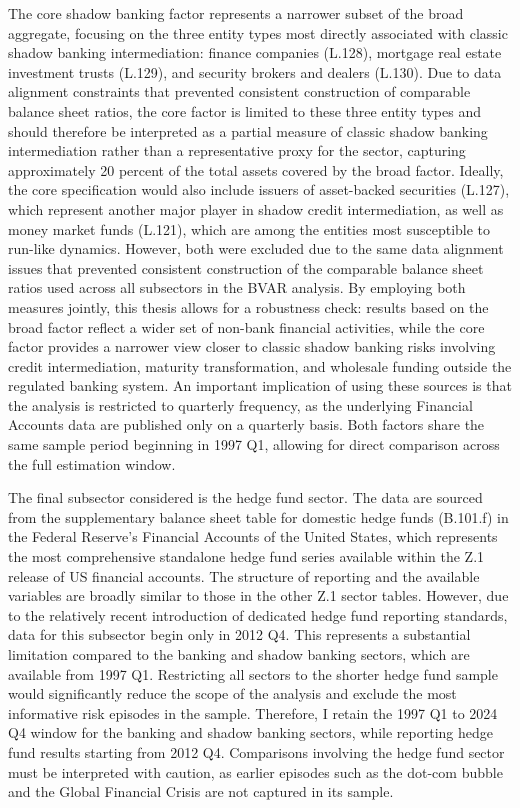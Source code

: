 \documentclass[12pt,a4paper]{report}\usepackage[a4paper, top=2.5cm, bottom=2.5cm, left=2.5cm, right=2.5cm]{geometry}
\begin{document}
The core shadow banking factor represents a narrower subset of the broad aggregate, focusing on the three entity types most directly associated with classic shadow banking intermediation: finance companies (L.128), mortgage real estate investment trusts (L.129), and security brokers and dealers (L.130). Due to data alignment constraints that prevented consistent construction of comparable balance sheet ratios, the core factor is limited to these three entity types and should therefore be interpreted as a partial measure of classic shadow banking intermediation rather than a representative proxy for the sector, capturing approximately 20 percent of the total assets covered by the broad factor. Ideally, the core specification would also include issuers of asset-backed securities (L.127), which represent another major player in shadow credit intermediation, as well as money market funds (L.121), which are among the entities most susceptible to run-like dynamics. However, both were excluded due to the same data alignment issues that prevented consistent construction of the comparable balance sheet ratios used across all subsectors in the BVAR analysis. By employing both measures jointly, this thesis allows for a robustness check: results based on the broad factor reflect a wider set of non-bank financial activities, while the core factor provides a narrower view closer to classic shadow banking risks involving credit intermediation, maturity transformation, and wholesale funding outside the regulated banking system. An important implication of using these sources is that the analysis is restricted to quarterly frequency, as the underlying Financial Accounts data are published only on a quarterly basis. Both factors share the same sample period beginning in 1997 Q1, allowing for direct comparison across the full estimation window.


The final subsector considered is the hedge fund sector. The data are sourced from the supplementary balance sheet table for domestic hedge funds (B.101.f) in the Federal Reserve's Financial Accounts of the United States, which represents the most comprehensive standalone hedge fund series available within the Z.1 release of US financial accounts. The structure of reporting and the available variables are broadly similar to those in the other Z.1 sector tables. However, due to the relatively recent introduction of dedicated hedge fund reporting standards, data for this subsector begin only in 2012 Q4. This represents a substantial limitation compared to the banking and shadow banking sectors, which are available from 1997 Q1. Restricting all sectors to the shorter hedge fund sample would significantly reduce the scope of the analysis and exclude the most informative risk episodes in the sample. Therefore, I retain the 1997 Q1 to 2024 Q4 window for the banking and shadow banking sectors, while reporting hedge fund results starting from 2012 Q4. Comparisons involving the hedge fund sector must be interpreted with caution, as earlier episodes such as the dot-com bubble and the Global Financial Crisis are not captured in its sample. 
\end{document}
